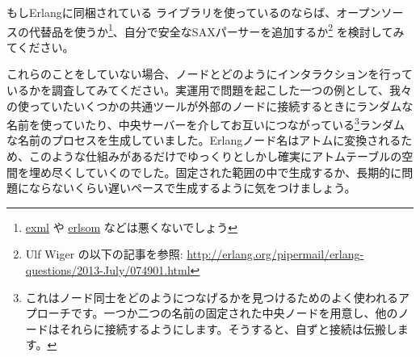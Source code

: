 もしErlangに同梱されている  ライブラリを使っているのならば、オープンソースの代替品を使うか\footnote{\href{https://github.com/paulgray/exml}{exml} や \href{https://github.com/willemdj/erlsom}{erlsom} などは悪くないでしょう}、自分で安全なSAXパーサーを追加するか\footnote{Ulf Wiger の以下の記事を参照:  \href{http://erlang.org/pipermail/erlang-questions/2013-July/074901.html}{http://erlang.org/pipermail/erlang-questions/2013-July/074901.html}} を検討してみてください。

これらのことをしていない場合、ノードとどのようにインタラクションを行っているかを調査してみてください。実運用で問題を起こした一つの例として、我々の使っていたいくつかの共通ツールが外部のノードに接続するときにランダムな名前を使っていたり、中央サーバーを介してお互いにつながっている\footnote{これはノード同士をどのようにつなげるかを見つけるためのよく使われるアプローチです。一つか二つの名前の固定された中央ノードを用意し、他のノードはそれらに接続するようにします。そうすると、自ずと接続は伝搬します。}ランダムな名前のプロセスを生成していました。Erlangノード名はアトムに変換されるため、このような仕組みがあるだけでゆっくりとしかし確実にアトムテーブルの空間を埋め尽くしていくのでした。固定された範囲の中で生成するか、長期的に問題にならないくらい遅いペースで生成するように気をつけましょう。

